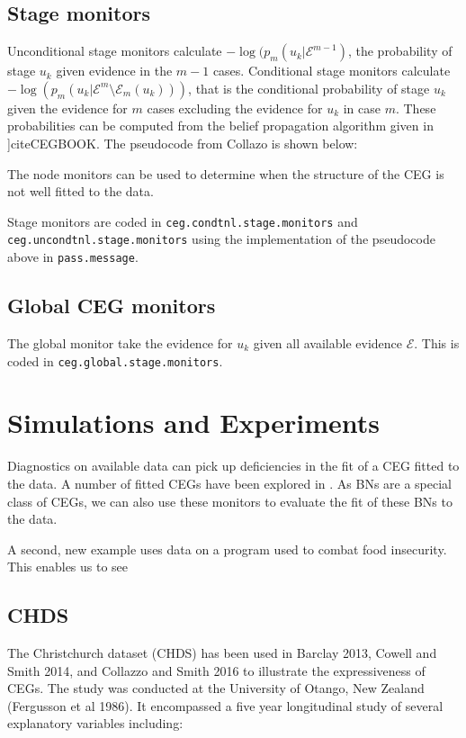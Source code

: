 \documentclass[12pt]{article}
\begin{document}
 

\subsection{Stage monitors}
 
 Unconditional stage monitors calculate $-\log (p_m(u_k | \mathcal{E}^{m-1})$, the probability of stage $u_k$ given evidence in the $m-1$ cases. 
 Conditional stage monitors calculate $-\log (p_m(u_k | \mathcal{E}^m \setminus \mathcal{E}_m(u_k)))$, that is the conditional probability of stage $u_k$ given the evidence for $m$ cases excluding the evidence for $u_k$ in case $m$. These probabilities can be computed from the belief propagation algorithm given in ]cite{CEGBOOK}. The pseudocode from Collazo is shown below:
 
 The node monitors can be used to determine when the structure of the CEG is not well fitted to the data.
 
 
 Stage monitors are coded in \texttt{ceg.condtnl.stage.monitors} and \texttt{ceg.uncondtnl.stage.monitors} using the implementation of the pseudocode above in \texttt{pass.message}.

 
 
\subsection{Global CEG monitors}

The global monitor take the evidence for $u_k$ given all available evidence $\mathcal{E}$. This is coded in \texttt{ceg.global.stage.monitors}. 


\section{Simulations and Experiments}

Diagnostics on available data can pick up deficiencies in the fit of a CEG fitted to the data. A number of fitted CEGs have been explored in \cite{CEGbook}. As BNs are a special class of CEGs, we can also use these monitors to evaluate the fit of these BNs to the data. 

A second, new example uses data on a program used to combat food insecurity. This enables us to see 


\subsection{CHDS}

The Christchurch dataset (CHDS) has been used in Barclay 2013, Cowell and Smith 2014, and Collazzo and Smith 2016 to illustrate the expressiveness of CEGs. The study was conducted at the University of Otango, New Zealand (Fergusson et al 1986). It encompassed a five year longitudinal study of several explanatory variables including: 
\end{document}
